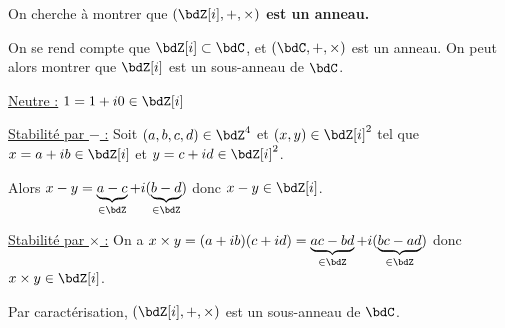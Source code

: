 \documentclass[a4paper,french,bookmarks]{article}
\begin{document}
\begin{example}{}{}
        
    On cherche à montrer que \bf{$(\bdZ[i], +, \times)$ est un anneau}.
    \tcblower
        
    On se rend compte que $\bdZ[i] \subset \bdC$, et $(\bdC, +, \times)$ est un anneau. On peut alors montrer que $\bdZ[i]$ est un sous-anneau de $\bdC$.
    
    \begin{enumerate}
        \ithand \underline{Neutre :} $1 = 1 + i0 \in \bdZ[i]$
        
        \ithand \underline{Stabilité par $-$ :} Soit $(a, b, c, d) \in \bdZ^4$ et $(x, y) \in \bdZ[i]^2$ tel que $x = a + ib \in \bdZ[i]$ et $y = c + id \in \bdZ[i]^2$.
        
        Alors $x-y = \underbrace{a-c}_{\in \bdZ} + i(\underbrace{b-d}_{\in \bdZ})$ donc $x-y \in \bdZ[i]$.
        
        \ithand \underline{Stabilité par $\times$ :} On a $x \times y = (a+ib)(c+id) = \underbrace{ac-bd}_{\in \bdZ} + i(\underbrace{bc-ad}_{\in \bdZ})$ donc $x\times y \in \bdZ[i]$. 
    \end{enumerate}
    Par caractérisation, $(\bdZ[i], +, \times)$ est un sous-anneau de $\bdC$.
\end{example}
\end{document}
